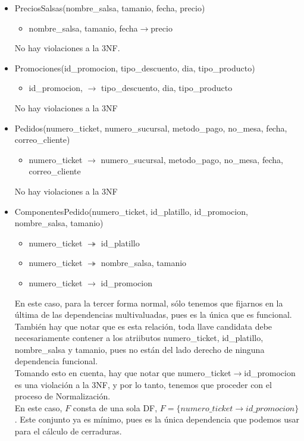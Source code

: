 \documentclass[11pt]{article}
\begin{document}
\begin{itemize}
\item PreciosSalsas(nombre\_salsa, tamanio, fecha, precio)
      \begin{itemize}
        \item nombre\_salsa, tamanio, fecha$\rightarrow$precio
      \end{itemize}
      No hay violaciones a la 3NF.
\item Promociones(id\_promocion, tipo\_descuento, dia, tipo\_producto)
      \begin{itemize}
        \item id\_promocion, $\rightarrow$ tipo\_descuento, dia, tipo\_producto
      \end{itemize}
      No hay violaciones a la 3NF
\item Pedidos(numero\_ticket, numero\_sucursal, metodo\_pago, no\_mesa, fecha, correo\_cliente)
      \begin{itemize}
        \item numero\_ticket $\rightarrow$ numero\_sucursal, metodo\_pago, no\_mesa, fecha, correo\_cliente
      \end{itemize}
      No hay violaciones a la 3NF
\item ComponentesPedido(numero\_ticket, id\_platillo, id\_promocion, nombre\_salsa, tamanio)
      \begin{itemize}
        \item numero\_ticket $\twoheadrightarrow$ id\_platillo
        \item numero\_ticket $\twoheadrightarrow$ nombre\_salsa, tamanio
        \item numero\_ticket $\rightarrow$ id\_promocion
      \end{itemize}
      En este caso, para la tercer forma normal, sólo tenemos que fijarnos en la última de las dependencias multivaluadas, pues es la única que es funcional. También hay que notar que es esta relación, toda llave candidata debe necesariamente contener a los atriibutos numero\_ticket, id\_platillo, nombre\_salsa y tamanio, pues no están del lado derecho de ninguna dependencia funcional.\\
      Tomando esto en cuenta, hay que notar que numero\_ticket$\rightarrow$id\_promocion es una violación a la 3NF, y por lo tanto, tenemos que proceder con el proceso de Normalización.\\
      En este caso, $F$ consta de una sola DF, $F = \{numero\_ticket  \rightarrow id\_promocion\}$. Este conjunto ya es mínimo, pues es la única dependencia que podemos usar para el cálculo de cerraduras. \\

\end{itemize}
\end{document}
